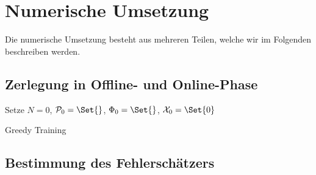 \documentclass[../main.tex]{subfiles}
\begin{document}
\clearpage

\section{Numerische Umsetzung} %
\label{sub:grb:rb:numerische_umsetzung}

Die numerische Umsetzung besteht aus mehreren Teilen, welche wir im Folgenden beschreiben werden.

\subsection{Zerlegung in Offline- und Online-Phase} %
\label{sub:zerlegung_in_offline_und_online_phase}

\begin{algorithm}[tb]
    \DontPrintSemicolon
    \BlankLine
    Setze $N = 0$, $\mathcal P_{0} = \Set{}$, $\Phi_{0} = \Set{}$, $\mathcal X_{0} = \Set{0}$\;
    \caption{Greedy Training}
    \label{algorithm:greedy_training}
\end{algorithm}


\subsection{Bestimmung des Fehlerschätzers} %
\label{sub:bestimmung_des_fehlersch_tzers}
\end{document}
